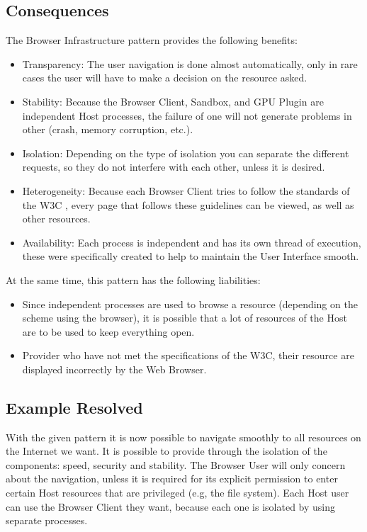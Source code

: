 \documentclass{sig-alternate-05-2015}
\begin{document}
  \subsection*{Consequences}
  The Browser Infrastructure pattern provides the following benefits:
  \begin{itemize}
    \item Transparency: The user navigation is done almost automatically, only in rare cases the user will have to make a decision on the resource asked.
    \item Stability: Because the Browser Client, Sandbox, and GPU  Plugin are independent Host processes, the failure of one will not generate problems in other (crash, memory corruption, etc.).
    \item Isolation: Depending on the type of isolation you can separate the different requests, so they do not interfere with each other, unless it is desired.
    \item Heterogeneity: Because each Browser Client tries to follow the standards of the W3C \cite{w3c}, every page that follows these guidelines can be viewed, as well as other resources.
    \item Availability: Each process is independent and has its own thread of execution, these were specifically created to help to maintain the User Interface smooth.
  \end{itemize}
  At the same time, this pattern has the following liabilities:
  \begin{itemize}
    \item Since independent processes are used to browse a resource (depending on the scheme using the browser), it is possible that a lot of resources of the Host are to be used to keep everything open.
    \item Provider who have not met the specifications of the W3C, their resource are displayed incorrectly by the Web Browser.
  \end{itemize}

  \subsection*{Example Resolved}
With the given pattern it is now possible to navigate smoothly to all resources on the Internet we want. It is possible to provide through the isolation of the components: speed, security and stability. The Browser User will only concern about the navigation, unless it is required for its explicit permission to enter certain Host resources that are privileged (e.g, the file system). Each Host user can use the Browser Client they want, because each one is isolated by using separate processes.
\end{document}
